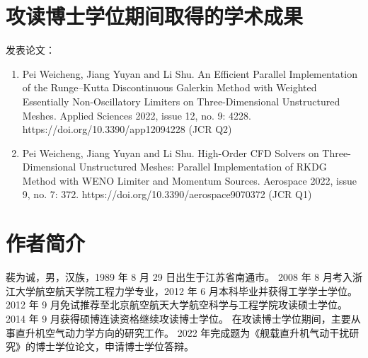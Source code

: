 \documentclass[doctor,openright,twoside,color,AutoFakeBold=true]{buaathesis}
\theoremstyle{plain}
\theoremstyle{definition}
\theoremstyle{plain}
\theoremstyle{plain}
\theoremstyle{remark}
\theoremstyle{remark}
\theoremstyle{definition}
\theoremstyle{plain}
\theoremstyle{definition}
\theoremstyle{plain}
\theoremstyle{plain}
\theoremstyle{remark}
\theoremstyle{plain}
\theoremstyle{definition}
\theoremstyle{remark}
\theoremstyle{plain}
\theoremstyle{remark}
\theoremstyle{definition}
\theoremstyle{plain}
\theoremstyle{plain}
\theoremstyle{definition}
\theoremstyle{plain}
\theoremstyle{plain}
\theoremstyle{definition}
\begin{document}
\mainmatter
\pagestyle{mainmatter}




\cleardoublepage
{}
{}

\cleardoublepage

\appendix
%

\backmatter

\chapter{攻读博士学位期间取得的学术成果}
\noindent 发表论文：
\begin{enumerate}
\item
Pei Weicheng, Jiang Yuyan and Li Shu. An Efficient Parallel Implementation of the Runge–Kutta Discontinuous Galerkin Method with Weighted Essentially Non-Oscillatory Limiters on Three-Dimensional Unstructured Meshes. Applied Sciences 2022, issue 12, no. 9: 4228. https://doi.org/10.3390/app12094228 (JCR Q2)
\item
Pei Weicheng, Jiang Yuyan and Li Shu. High-Order CFD Solvers on Three-Dimensional Unstructured Meshes: Parallel Implementation of RKDG Method with WENO Limiter and Momentum Sources. Aerospace 2022, issue 9, no. 7: 372. https://doi.org/10.3390/aerospace9070372  (JCR Q1)
\end{enumerate}



\chapter{作者简介}
裴为诚，男，汉族，1989 年 8 月 29 日出生于江苏省南通市。
2008 年 8 月考入浙江大学航空航天学院工程力学专业，2012 年 6 月本科毕业并获得工学学士学位。
2012 年 9 月免试推荐至北京航空航天大学航空科学与工程学院攻读硕士学位。
2014 年 9 月获得硕博连读资格继续攻读博士学位。
在攻读博士学位期间，主要从事直升机空气动力学方向的研究工作。
2022 年完成题为《舰载直升机气动干扰研究》的博士学位论文，申请博士学位答辩。
\end{document}
